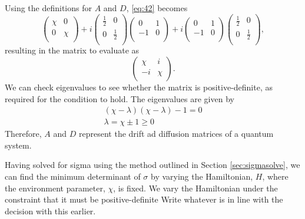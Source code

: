 \documentclass[11pt,a4paper]{article}
\numberwithin{equation}{section}
\begin{document}
	Using the definitions for $A$ and $D$, \ref{eq:42} becomes	
	\begin{equation*}
	\begin{pmatrix}
	\chi & 0  \\
	0 & \chi \\
	\end{pmatrix} + i\begin{pmatrix}
	\frac{1}{2} & 0  \\
	0 & \frac{1}{2} \\
	\end{pmatrix}\begin{pmatrix}
	0 & 1  \\
	-1 & 0 \\
	\end{pmatrix} + i\begin{pmatrix}
	0 & 1  \\
	-1 & 0 \\
	\end{pmatrix}\begin{pmatrix}
	\frac{1}{2} & 0  \\
	0 & \frac{1}{2} \\
	\end{pmatrix},
	\end{equation*}
	resulting in the matrix to evaluate as
	\begin{equation*}
	\begin{pmatrix}
	\chi & i  \\
	-i & \chi \\
	\end{pmatrix}.
	\end{equation*}
	We can check eigenvalues to see whether the matrix is positive-definite, as required for the condition to hold. The eigenvalues are given by
	\begin{align*}
	&(\chi- \lambda)(\chi- \lambda) - 1 = 0&\\
	&\lambda = \chi \pm 1 \geq 0&\tag*{as $\chi \geq 1$}
	\end{align*}
	Therefore, $A$ and $D$ represent the drift ad diffusion matrices of a quantum system.
	
	
	Having solved for sigma using the method outlined in Section \ref{sec:sigmasolve}, we can find the minimum determinant of $\sigma$ by varying the Hamiltonian, $H$, where the environment parameter, $\chi$, is fixed. We vary the Hamiltonian under the constraint that it must be positive-definite \color{red}Write whatever is in line with the decision with this earlier\color{black}. 
	
\end{document}
